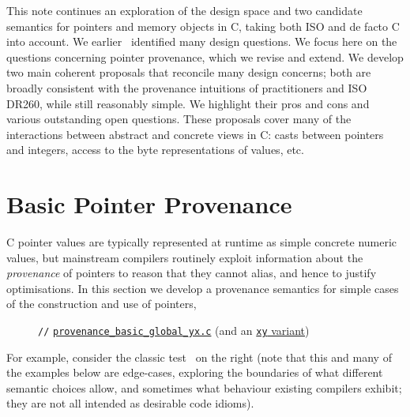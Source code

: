 \documentclass[acmsmall,review,screen]{acmart}\settopmatter{printfolios=true,printccs=false,printacmref=false}
\newcommand{\mytesturl}[1]{https://cerberus.cl.cam.ac.uk/cerberus?defacto/#1}
\newcommand{\mytestlink}[2]{\href{\mytesturl{#1}}{#2}}
\newcommand{\mylistingmargin}{5mm}
\newcommand{\myfoolinkexample}[4]{{\vspace*{-0.5\baselineskip}\par{\noindent\small\hspace*{\mylistingmargin}\lstinline{//} #4\vspace*{0.25\baselineskip}\par}}}
\begin{document}
This note continues 
an exploration of the design space and two candidate semantics for pointers and memory
objects in C, taking
both ISO and de facto C into account. 
%
We earlier~\cite{Cerberus-PLDI16,N2013} identified many
design questions. 
%
We focus here on the questions concerning pointer provenance, which we revise and
extend.  We develop two main coherent proposals that reconcile many design
concerns; both are broadly consistent with the provenance intuitions of
practitioners and ISO DR260, while still reasonably simple. We
highlight their pros and cons and various outstanding open questions.
These proposals cover many of the interactions between abstract and concrete
views in C: casts between pointers and integers, access to the byte
representations of values, etc.
%

\section{Basic Pointer Provenance}\label{sec:prov}

C pointer values are typically represented at runtime as simple
concrete numeric values, but mainstream compilers routinely exploit
information about the \emph{provenance} of pointers to reason that they
cannot alias, and hence to justify optimisations.
In this section we develop a provenance semantics for simple cases of
the construction and use of pointers, 

%
\begin{figure}
{\renewcommand{\mylistingmargin}{0mm}\myfoolinkexample{charon_tests/}{provenance_basic_global_yx.c}{}{\mytestlink{provenance_basic_global_yx.c}{\lstinline{provenance_basic_global_yx.c}}
(and an \mytestlink{provenance_basic_global_xy.c}{\texttt{xy} variant})}%
}
\vspace*{-\baselineskip}
\end{figure}
For example, consider
 the classic test~\cite{dr260,N1637,krebbers-phd,N2013,Cerberus-PLDI16}
 on the right
(note that this and many of the examples below are edge-cases,
exploring the boundaries of what different semantic choices allow,
and sometimes 
what behaviour existing compilers exhibit;
they are not all intended as desirable code idioms).
\end{document}
